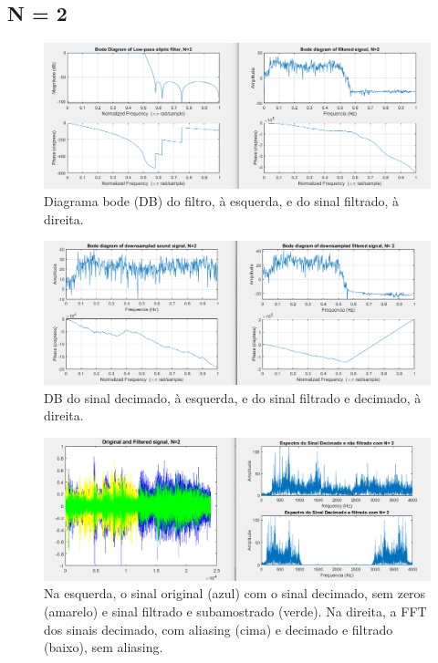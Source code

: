 \documentclass{article}
\begin{document}
\subsection{N = 2}
\vfill
\begin{figure}[h!]
\centering
\includegraphics[scale=0.5]{matlab_test_images/cut_images/fil2.PNG}
\caption{Diagrama bode (DB) do filtro, à esquerda, e do sinal filtrado, à direita.}
\label{fig:matlab_test_images/cut_images/fil2}
\end{figure}
\begin{figure}[h!]
\centering
\includegraphics[scale=0.5]{matlab_test_images/cut_images/fil3.PNG}
\caption{DB do sinal decimado, à esquerda, e do sinal filtrado e decimado, à direita.}
\label{fig:matlab_test_images/cut_images/fil3}
\end{figure}  
\newpage
\begin{figure}[h!]
\centering
\includegraphics[scale=0.5]{matlab_test_images/cut_images/fil4.PNG}
\caption{Na esquerda, o sinal original (azul) com o sinal decimado, sem zeros (amarelo) e sinal filtrado e subamostrado (verde). Na direita, a FFT dos sinais decimado, com aliasing (cima) e decimado e filtrado (baixo), sem aliasing.}
\label{fig:matlab_test_images/cut_images/fil4}
\end{figure}  
\end{document}
